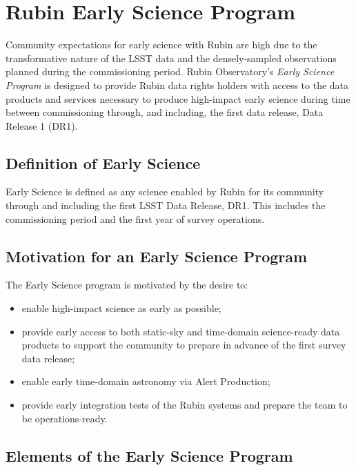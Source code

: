\section{Rubin Early Science Program}

Community expectations for early science with Rubin are high due to the transformative nature of the LSST data and the densely-sampled observations planned during the commissioning period.
Rubin Observatory's \emph{Early Science Program} is designed to provide Rubin data rights holders with access to the data products and services necessary to produce high-impact early science during time between commissioning through, and including, the first data release, Data Release 1 (DR1). 

\subsection{Definition of Early Science}  \label{ssec:defn}
Early Science is defined as any science enabled by Rubin for its community through and including the first LSST Data Release, DR1.
 This includes the commissioning period and the first year of survey operations.

\subsection{Motivation for an Early Science Program}  \label{ssec:motivation}

The Early Science program is motivated by the desire to:
\begin{itemize}
\item enable high-impact science as early as possible;
\item provide early access to both static-sky and time-domain science-ready data products to support the community to prepare in advance of the first survey data release;
\item enable early time-domain astronomy via Alert Production;
\item provide early integration tests of the Rubin systems and prepare the team to be operations-ready.
\end{itemize}


\subsection{Elements of the Early Science Program}

